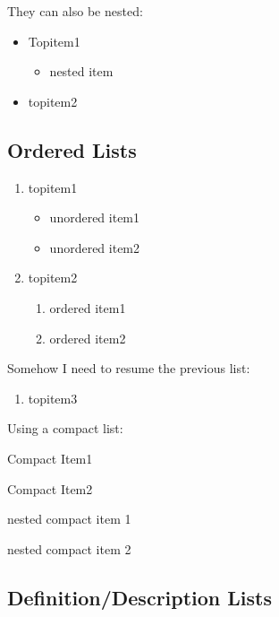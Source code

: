 \documentclass[a4paper,12pt]{article}
\begin{document}
They can also be nested:

\begin{itemize}
  \item Topitem1
        \begin{itemize}
          \item nested item
        \end{itemize}
  \item topitem2
\end{itemize}

\subsection{Ordered Lists}

\begin{enumerate}
  \item topitem1
        \begin{itemize}
          \item unordered item1
          \item unordered item2
        \end{itemize}
  \item topitem2
        \begin{enumerate}[label=\Roman*] %
          \item ordered item1
          \item  ordered item2
        \end{enumerate}
\end{enumerate}

Somehow I need to resume the previous list:

\begin{enumerate}[resume*]
  \item topitem3
\end{enumerate}

Using a compact list:

\begin{compactenum}
  \item Compact Item1
  \item Compact Item2
  \begin{compactitem}
    \item nested compact item 1
    \item nested compact item 2
  \end{compactitem}
\end{compactenum}

\subsection{Definition/Description Lists}
\end{document}
